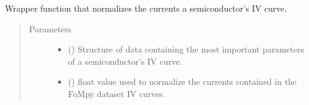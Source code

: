 \documentclass[letterpaper,10pt,english,openany, oneside]{sphinxmanual}
\begin{document}

\begin{fulllineitems}
\label{\detokenize{index:fompy.wrappers.normalize}}
Wrapper function that normalizes the currents a semiconductor’s IV curve.
\begin{quote}\begin{description}
\item[{Parameters}] \leavevmode\begin{itemize}
\item {} 
 () \textendash{} Structure of data containing the most important parameters of a semiconductor’s IV curve.

\item {} 
 () \textendash{} float value used to normalize the currents contained in the FoMpy dataset IV curves.

\end{itemize}

\end{description}\end{quote}

\end{fulllineitems}

\end{document}
